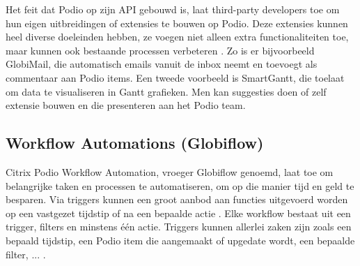
Het feit dat Podio op zijn API gebouwd is, laat third-party developers toe om hun eigen uitbreidingen of extensies te bouwen op Podio. Deze extensies kunnen heel diverse doeleinden hebben, ze voegen niet alleen extra functionaliteiten toe, maar kunnen ook bestaande processen verbeteren \autocite{PodioExtensions}. Zo is er bijvoorbeeld GlobiMail, die automatisch emails vanuit de inbox neemt en toevoegt als commentaar aan Podio items. Een tweede voorbeeld is SmartGantt, die toelaat om data te visualiseren in Gantt grafieken. Men kan suggesties doen of zelf extensie bouwen en die presenteren aan het Podio team. \\



\subsection{Workflow Automations (Globiflow)}

Citrix Podio Workflow Automation, vroeger Globiflow genoemd, laat toe om belangrijke taken en processen te automatiseren, om op die manier tijd en geld te besparen. Via triggers kunnen een groot aanbod aan functies uitgevoerd worden op een vastgezet tijdstip of na een bepaalde actie \autocite{PodioWorkflowAutomation}. Elke workflow bestaat uit een trigger, filters en minstens één actie. Triggers kunnen allerlei zaken zijn zoals een bepaald tijdstip, een Podio item die aangemaakt of upgedate wordt, een bepaalde filter, ... \autocite{PodioWorkflowFeatures}. \\

